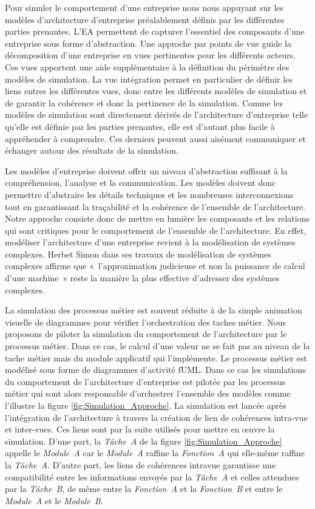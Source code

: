 Pour simuler le comportement d'une entreprise nous nous appuyant sur les modèles d'architecture d'entreprise préalablement définis par les différentes parties prenantes. L'EA permettent de capturer l'essentiel des composants d'une entreprise sous forme d'abstraction. Une approche par points de vue guide la décomposition d'une entreprise en vues pertinentes pour les différents acteurs. Ces vues apportent une aide supplémentaire à la définition du périmètre des modèles de simulation. La vue intégration permet en particulier de définir les liens entres les différentes vues, donc entre les différents modèles de simulation et de garantir la cohérence et donc la pertinence de la simulation. Comme les modèles de simulation sont directement dérivés de l'architecture d'entreprise telle qu'elle est définie par les parties prenantes, elle est d'autant plus facile à appréhender à comprendre. Ces derniers peuvent aussi aisément communiquer et échanger autour des résultats de la simulation. 

Les modèles d'entreprise doivent offrir un niveau d'abstraction suffisant à la compréhension, l'analyse et la communication. Les modèles doivent donc permettre d'abstraire les détails techniques et les nombreuses interconnexions tout en garantissant la traçabilité et la cohérence de l'ensemble de l'architecture. Notre approche consiste donc de mettre en lumière les composants et les relations qui sont critiques pour le comportement de l'ensemble de l'architecture. En effet, modéliser l'architecture d'une entreprise revient à la modélisation de systèmes complexes. Herbet Simon \cite{simon1990prediction} dans ses travaux de modélisation de systèmes complexes affirme que «~l'approximation judicieuse et non la puissance de calcul d'une machine~» reste la manière la plus effective d'adresser des systèmes complexes.

La simulation des processus métier est souvent réduite à de la simple animation visuelle de diagrammes pour vérifier l'orchestration des taches métier. Nous proposons de piloter la simulation du comportement de l'architecture par le processus métier. Dans ce cas, le calcul d'une valeur ne se fait pas au niveau de la tache métier mais du module applicatif qui l'implémente. Le processus métier est modélisé sous forme de diagrammes d'activité fUML. Dans ce cas les simulations du comportement de l'architecture d'entreprise est pilotée par les processus métier qui sont alors responsable d'orchestrer l'ensemble des modèles comme l'illustre la figure \ref{fig:Simulation_Approche}. La simulation est lancée après l'intégration de l'architecture à travers la création de lien de cohérences intra-vue et inter-vues. Ces liens sont par la suite utilisés pour mettre en œuvre la simulation. D'une part, la \textit{Tâche~A} de la figure \ref{fig:Simulation_Approche} appelle le \textit{Module~A} car le \textit{Module~A} raffine la \textit{Fonction~A} qui elle-même raffine la \textit{Tâche~A}. D'autre part, les liens de cohérences intravue garantisse une compatibilité entre les informations envoyés par la \textit{Tâche~A} et celles attendues par la \textit{Tâche~B}, de même entre la \textit{Fonction~A} et la \textit{Fonction~B} et entre le \textit{Module~A} et le \textit{Module~B}.

